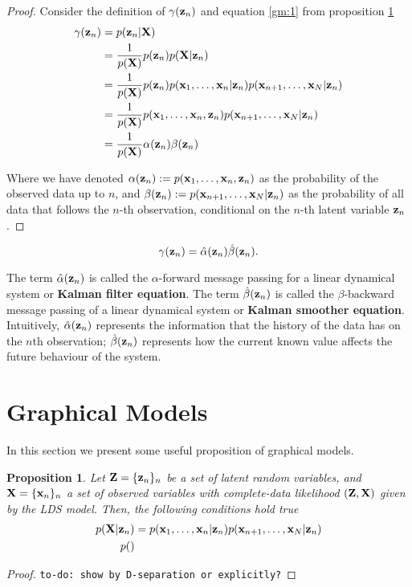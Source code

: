\documentclass[11pt]{article}
\newtheorem{proposition}{Proposition}[section]
\begin{document}
\begin{proof}
Consider the definition of $\gamma({\bf z}_n)$ and equation \ref{gm:1} from proposition \ref{prop:graphical-models-separation}
\begin{align}
	\gamma({\bf z}_n) &= p({\bf z}_n \vert {\bf X})\\
					  &= \frac{1}{p({\bf X})}p({\bf z}_n)p({\bf X} \vert {\bf z}_n)\\
					  &= \frac{1}{p({\bf X})} p({\bf z}_n) p({\bf x}_1, \ldots, {\bf x}_n\vert {\bf z}_n) p({\bf x}_{n+1}, \ldots, {\bf x}_N\vert {\bf z}_n)\\
					  &= \frac{1}{p({\bf X})}p({\bf x}_1, \ldots, {\bf x}_n, {\bf z}_n) p({\bf x}_{n+1}, \ldots, {\bf x}_N\vert {\bf z}_n)\\
					  &= \frac{1}{p({\bf X})}\alpha({\bf z}_n)\beta({\bf z}_n)
\end{align}

Where we have denoted $\alpha({\bf z}_n) := p({\bf x}_1, \ldots, {\bf x}_n, {\bf z}_n)$ as the probability of the observed data up to $n$, and $\beta({\bf z}_n) := p({\bf x}_{n+1}, \ldots, {\bf x}_N\vert {\bf z}_n)$ as the probability of all data that follows the $n$-th observation, conditional on the $n$-th latent variable ${\bf z}_n$.
\end{proof}


\begin{equation}
	\gamma({\bf z}_n) = \hat\alpha({\bf z}_n)\hat\beta({\bf z}_n).
\end{equation}

The term $\hat\alpha({\bf z}_n)$ is called the $\alpha$-forward message passing for a linear dynamical system or \textbf{Kalman filter equation}.  The term $\hat\beta({\bf z}_n)$ is called the $\beta$-backward message passing of a linear dynamical system or \textbf{Kalman smoother equation}. Intuitively, $\hat\alpha({\bf z}_n)$ represents the information that the history of the data has on the $n$th observation; $\hat\beta({\bf z}_n)$ represents how the current known value affects the future behaviour of the system.


\section{Graphical Models}
In this section we present some useful proposition of graphical models.

\begin{proposition}\label{prop:graphical-models-separation}
	Let ${\bf Z} = \{{\bf z}_n\}_n$ be a set of latent random variables, and ${\bf X} = \{{\bf x}_n\}_n$ a set of observed variables with complete-data likelihood $({\bf Z}, {\bf X})$ given by the LDS model. Then, the following conditions hold true
	\begin{align}
		p({\bf X}\vert{\bf z}_n) &= p({{\bf x}_1, \ldots, {\bf x}_n \vert {\bf z}_n})p({{\bf x}_{n+1}, \ldots, {\bf x}_N \vert {\bf z}_n}) \label{gm:1}\\
		p()
	\end{align}
\end{proposition}

\begin{proof}
	\texttt{to-do: show by D-separation or explicitly?}
\end{proof}
\end{document}

